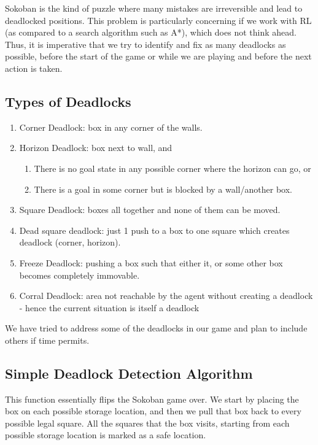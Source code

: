 \documentclass{article}
\begin{document}
Sokoban is the kind of puzzle where many mistakes are irreversible and lead to deadlocked positions. This problem is particularly concerning if we work with RL (as compared to a search algorithm such as A*), which does not think ahead. Thus, it is imperative that we try to identify and fix as many deadlocks as possible, before the start of the game or while we are playing and before the next action is taken.  

\subsection{Types of Deadlocks}
\begin{enumerate}
    \item Corner Deadlock: box in any corner of the walls.
    \item Horizon Deadlock: box next to wall, and 
    \begin{enumerate}[label=\alph*)]
        \item There is no goal state in any possible corner where the horizon can go, or
        \item There is a goal in some corner but is blocked by a wall/another box.
    \end{enumerate}
    \item Square Deadlock: boxes all together and none of them can be moved.
    \item Dead square deadlock: just 1 push to a box to one square which creates deadlock (corner, horizon).
    \item Freeze Deadlock: pushing a box such that either it, or some other box becomes completely immovable.
    \item Corral Deadlock: area not reachable by the agent without creating a deadlock - hence the current situation is itself a deadlock
\end{enumerate}

We have tried to address some of the deadlocks in our game and plan to include others if time permits. 

\subsection{Simple Deadlock Detection Algorithm}
This function essentially flips the Sokoban game over. We start by placing the box on each possible storage location, and then we pull that box back to every possible legal square. All the squares that the box visits, starting from each possible storage location is marked as a safe location.
\end{document}
